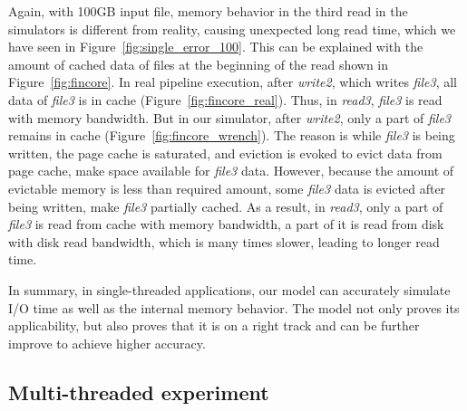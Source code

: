 \documentclass[conference]{IEEEtran}
\begin{document}
			Again, with 100GB input file, memory behavior in the third read in the 
			simulators is different from reality, causing unexpected long read time, 
			which we have seen in Figure~\ref{fig:single_error_100}. 
			This can be explained with the amount of cached data of files at the beginning 
			of the read shown in Figure~\ref{fig:fincore}. 
			In real pipeline execution, after \textit{write2}, which writes \textit{file3}, 
			all data of \textit{file3} is in cache (Figure~\ref{fig:fincore_real}). 
			Thus, in \textit{read3}, \textit{file3} is read with memory bandwidth. 
			But in our simulator, after \textit{write2}, only a part of \textit{file3} 
			remains in cache (Figure~\ref{fig:fincore_wrench}). 
			The reason is while \textit{file3}  is being written, the page cache is saturated, 
			and eviction is evoked to evict data from page cache, make space 
			available for \textit{file3} data. 
			However, because the amount of evictable memory is less than required amount, 
			some \textit{file3} data is evicted after being written, make \textit{file3} 
			partially cached. As a result, in \textit{read3}, only a part of \textit{file3} is read 
			from cache with memory bandwidth, a part of it is read from disk with disk read 
			bandwidth, which is many times slower, leading to longer read time. 			
			
			In summary, in single-threaded applications, our model can accurately 
			simulate I/O time as well as the internal memory behavior. 
			The model not only proves its applicability, but also proves that it is on 
			a right track and can be further improve to achieve higher accuracy. 
			
		\subsection{Multi-threaded experiment}
		
\end{document}
